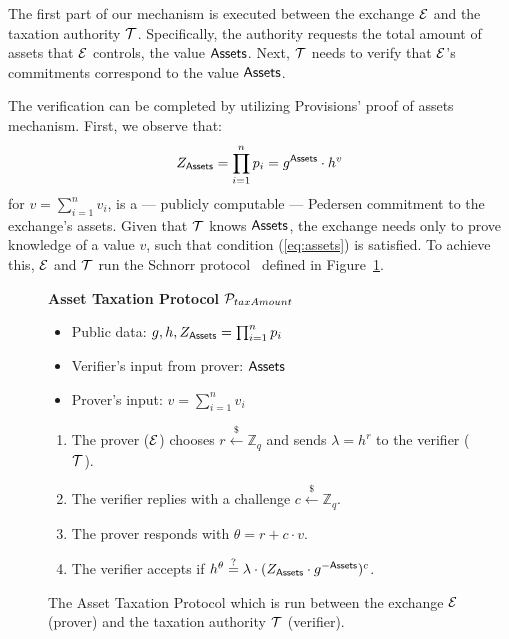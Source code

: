 The first part of our mechanism is executed between the exchange $\mathcal{E}$
and the taxation authority $\mathcal{T}$. Specifically, the authority requests the
total amount of assets that $\mathcal{E}$ controls, \ie the value $\mathsf{Assets}$.
Next, $\mathcal{T}$ needs to verify that $\mathcal{E}$'s commitments correspond to
the value $\mathsf{Assets}$.

The verification can be completed by utilizing Provisions' proof of assets
mechanism. First, we observe that:
\begin{align}
    Z_{\mathsf{Assets}} = \prod_{i = 1}^n p_i = g^{\mathsf{Assets}} \cdot h^v \label{eq:assets}
\end{align}
for $v = {\sum_{i = 1}^n v_i}$, is a --- publicly computable --- Pedersen
commitment to the exchange's assets. Given that $\mathcal{T}$ knows $\mathsf{Assets}$, the
exchange needs only to prove knowledge of a value $v$, such that condition
(\ref{eq:assets}) is satisfied. To achieve this, $\mathcal{E}$ and $\mathcal{T}$ run
the Schnorr protocol~\cite{C:Schnorr89} defined in
Figure~\ref{fig:taxation_auth_proto}.

\begin{figure}[h]
\begin{mdframed}

\begin{center}
    \textbf{Asset Taxation Protocol} $\mathcal{P}_{taxAmount}$
\end{center}

    \begin{itemize}
        \item Public data: $g, h, Z_{\mathsf{Assets}} = \prod_{i = 1}^n p_i$
        \item Verifier's input from prover: $\mathsf{Assets}$
        \item Prover's input: $v = \sum_{i = 1}^n v_i$
    \end{itemize}

    \begin{enumerate}
        \item The prover ($\mathcal{E}$) chooses $r \xleftarrow{\$} \mathbb{Z}_q$
            and sends $\lambda = h^r$ to the verifier ($\mathcal{T}$).
        \item The verifier replies with a challenge $c \xleftarrow{\$} \mathbb{Z}_q$.
        \item The prover responds with $\theta = r + c \cdot v$.
        \item The verifier accepts if $h^\theta \stackrel{?}{=} \lambda \cdot (Z_{\mathsf{Assets}} \cdot g^{-\mathsf{Assets}})^c$.
    \end{enumerate}

\end{mdframed}
\caption{
    The Asset Taxation Protocol which is run between the exchange $\mathcal{E}$
    (prover) and the taxation authority $\mathcal{T}$ (verifier).
}
\label{fig:taxation_auth_proto}
\end{figure}

